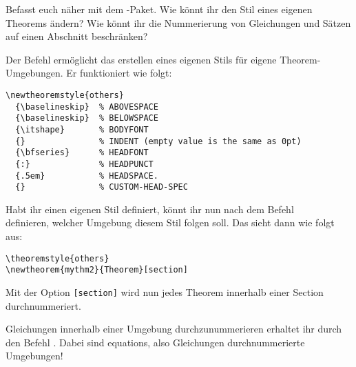\item 
    Befasst euch näher mit dem -Paket. Wie könnt ihr den Stil eines
    eigenen Theorems ändern? Wie könnt ihr die Nummerierung von Gleichungen und
    Sätzen auf einen Abschnitt beschränken? 
    \begin{loesung}
        Der Befehl  ermöglicht das erstellen eines eigenen
        Stils für eigene Theorem-Umgebungen. Er funktioniert wie folgt:
\begin{verbatim}
\newtheoremstyle{others} 
  {\baselineskip}  % ABOVESPACE
  {\baselineskip}  % BELOWSPACE
  {\itshape}       % BODYFONT
  {}               % INDENT (empty value is the same as 0pt)
  {\bfseries}      % HEADFONT
  {:}              % HEADPUNCT
  {.5em}           % HEADSPACE. 
  {}               % CUSTOM-HEAD-SPEC
\end{verbatim}
        Habt ihr einen eigenen Stil definiert, könnt ihr nun nach dem Befehl \\
         definieren, welcher Umgebung diesem Stil
        folgen soll. Das sieht dann wie folgt aus:
\begin{verbatim}
\theoremstyle{others}
\newtheorem{mythm2}{Theorem}[section]
\end{verbatim}
        Mit der Option \verb|[section]| wird nun jedes Theorem innerhalb einer
        Section durchnummeriert. 
                    
        Gleichungen innerhalb einer Umgebung durchzunummerieren erhaltet ihr
        durch den Befehl . Dabei sind
        equations, also Gleichungen durchnummerierte Umgebungen!
    \end{loesung}
              
        
       
